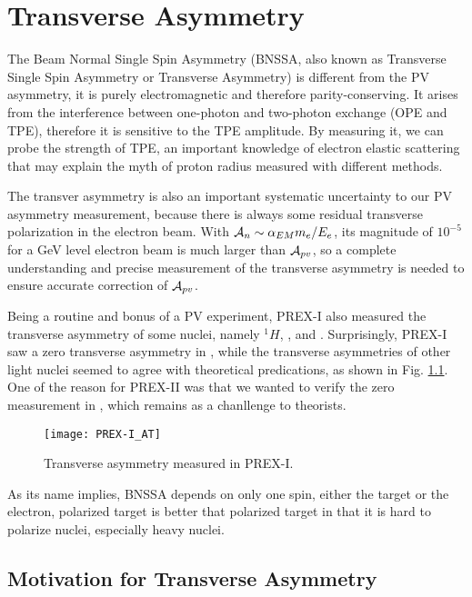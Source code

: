 \chapter{Transverse Asymmetry}
The Beam Normal Single Spin Asymmetry (BNSSA, also known as Transverse Single Spin Asymmetry
or Transverse Asymmetry) is different from the PV asymmetry, it is purely 
electromagnetic and therefore parity-conserving. It arises from the interference
between one-photon and two-photon exchange (OPE and TPE), therefore it is sensitive 
to the TPE amplitude. By measuring it, we can probe the strength of TPE, an 
important knowledge of electron elastic scattering that may explain the myth
of proton radius measured with different methods.

The transver asymmetry is also an important systematic uncertainty to our PV 
asymmetry measurement, because there is always some residual transverse polarization
in the electron beam. With $\mathcal{A}_n \sim \alpha_{EM}m_e/E_e$, its magnitude of $10^{-5}$
for a GeV level electron beam is much larger than $\mathcal{A}_{pv}$, so a complete 
understanding and precise measurement of the transverse asymmetry is needed
to ensure accurate correction of $\mathcal{A}_{pv}$.

Being a routine and bonus of a PV experiment, PREX-I also measured the transverse
asymmetry of some nuclei, namely ${}^{1}H$, \He, \C and \Pb. Surprisingly, PREX-I
saw a zero transverse asymmetry in \Pb, while the transverse asymmetries of other 
light nuclei seemed to agree with theoretical predications, as shown in 
Fig. \ref{fig:PREX-I_AT}. One of the reason for PREX-II was that we wanted to
verify the zero measurement in \Pb, which remains as a chanllenge to theorists.
\begin{figure}
    \centering
    \texttt{[image: PREX-I\_AT]}
    \caption{Transverse asymmetry measured in PREX-I.}
    \label{fig:PREX-I_AT}
\end{figure}

As its name implies, BNSSA depends on only one spin, either the target or the
electron, polarized target is better that polarized target in that it is hard
to polarize nuclei, especially heavy nuclei.

\section{Motivation for Transverse Asymmetry}

